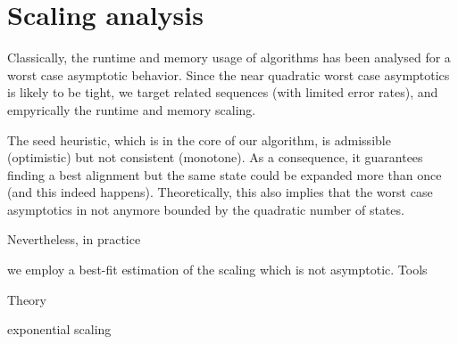 \section{Scaling analysis}

Classically, the runtime and memory usage of algorithms has been analysed for a
worst case asymptotic behavior. Since the near quadratic worst case asymptotics
is likely to be tight, we target related sequences (with limited error rates),
and empyrically the runtime and memory scaling.

The seed heuristic, which is in the core of our \A algorithm, is admissible
(optimistic) but not consistent (monotone). As a consequence, it guarantees
finding a best alignment but the same state could be expanded more than once
(and this indeed happens). Theoretically, this also implies that the worst
case asymptotics in not anymore bounded by the quadratic number of states.

Nevertheless, in practice

we employ a best-fit estimation of the scaling which
is not asymptotic. Tools

Theory

exponential scaling